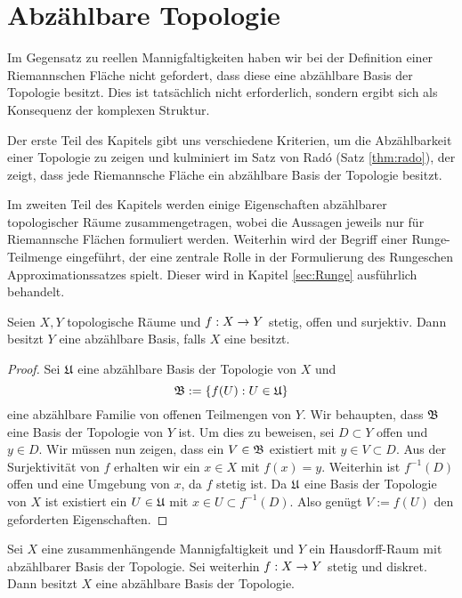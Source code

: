 
\section{Abzählbare Topologie}
\label{sec:Topologie}

Im Gegensatz zu reellen Mannigfaltigkeiten haben wir bei der
Definition einer Riemannschen Fläche nicht gefordert, dass diese eine
abzählbare Basis der Topologie besitzt. Dies ist tatsächlich nicht
erforderlich, sondern ergibt sich als Konsequenz der komplexen
Struktur.

Der erste Teil des Kapitels gibt uns verschiedene Kriterien, um die
Abzählbarkeit einer Topologie zu zeigen und kulminiert im Satz von
Rad\'o (Satz \ref{thm:rado}), der zeigt, dass jede Riemannsche Fläche
ein abzählbare Basis der Topologie besitzt.

Im zweiten Teil des Kapitels werden einige Eigenschaften abzählbarer
topologischer Räume zusammengetragen, wobei die Aussagen jeweils nur
für Riemannsche Flächen formuliert werden. Weiterhin wird der Begriff
einer Runge-Teilmenge eingeführt, der eine zentrale Rolle in der
Formulierung des Rungeschen Approximationssatzes spielt. Dieser wird
in Kapitel \ref{sec:Runge} ausführlich behandelt.

\begin{lemma}
  \label{lemma:surj-offen-top}
  Seien $X,Y$ topologische Räume und $f: X \rightarrow Y$ stetig, offen und
  surjektiv. Dann besitzt $Y$ eine abzählbare Basis, falls $X$ eine
  besitzt.
\end{lemma}

\begin{proof}
  Sei $\mathfrak{U}$ eine abzählbare Basis der Topologie von $X$ und
  \[
  \mathfrak{B} := \{ f(U) : U \in \mathfrak{U} \}
  \]
  eine abzählbare Familie von offenen Teilmengen von $Y$. Wir
  behaupten, dass $\mathfrak{B}$ eine Basis der Topologie von $Y$ ist. Um dies
  zu beweisen, sei $D \subset Y$ offen und $y \in D$. Wir
  müssen nun zeigen, dass ein $V \in \mathfrak{B}$ existiert mit $y \in V
  \subset D$. Aus der Surjektivität von $f$ erhalten wir ein $x \in X$ mit $f(x) =
  y$. Weiterhin ist $f^{-1}(D)$ offen und eine Umgebung von $x$, da
  $f$ stetig ist. Da $\mathfrak{U}$ eine Basis der Topologie von $X$ ist
  existiert ein $U \in \mathfrak{U}$ mit $x \in U \subset f^{-1}(D)$. Also
  genügt $V:=f(U)$ den geforderten Eigenschaften.
\end{proof}

\begin{lemma}
  \label{lemma:poincare-volterra}
  Sei $X$ eine zusammenhängende Mannigfaltigkeit und $Y$ ein
  Hausdorff-Raum mit abzählbarer Basis der Topologie. Sei weiterhin
  $f: X \rightarrow Y$ stetig und diskret. \\
  Dann besitzt $X$ eine abzählbare Basis der Topologie.
\end{lemma}

